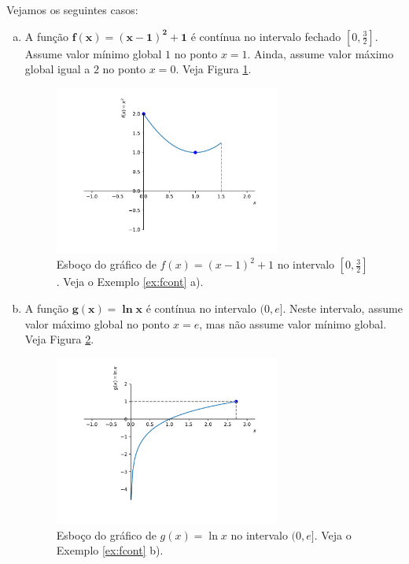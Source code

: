 \begin{ex}\label{ex:fcont}
  Vejamos os seguintes casos:
  \begin{enumerate}[a)]
  \item  A função $\pmb{f(x) = (x-1)^2+1}$ é contínua no intervalo fechado $\displaystyle \left[0, \frac{3}{2}\right]$. Assume valor mínimo global $1$ no ponto $x=1$. Ainda, assume valor máximo global igual a $2$ no ponto $x=0$. Veja Figura \ref{fig:ex_fcont_f}.
  \begin{figure}[H]
    \centering
    \includegraphics[width=0.7\textwidth]{./cap_apderiv/dados/fig_ex_fcont/fig_f}
    \caption{Esboço do gráfico de $f(x) = (x-1)^2+1$ no intervalo $\displaystyle\left[0, \frac{3}{2}\right]$. Veja o Exemplo \ref{ex:fcont} a).}
    \label{fig:ex_fcont_f}
  \end{figure}
\item A função $\pmb{g(x) = \ln x}$ é contínua no intervalo $(0, e]$. Neste intervalo, assume valor máximo global no ponto $x=e$, mas não assume valor mínimo global. Veja Figura \ref{fig:ex_fcont_g}.
  \begin{figure}[H]
    \centering
    \includegraphics[width=0.7\textwidth]{./cap_apderiv/dados/fig_ex_fcont/fig_g}
    \caption{Esboço do gráfico de $g(x) = \ln x$ no intervalo $(0,e]$. Veja o Exemplo \ref{ex:fcont} b).}
    \label{fig:ex_fcont_g}
  \end{figure}
  

\end{enumerate}
\end{ex}
